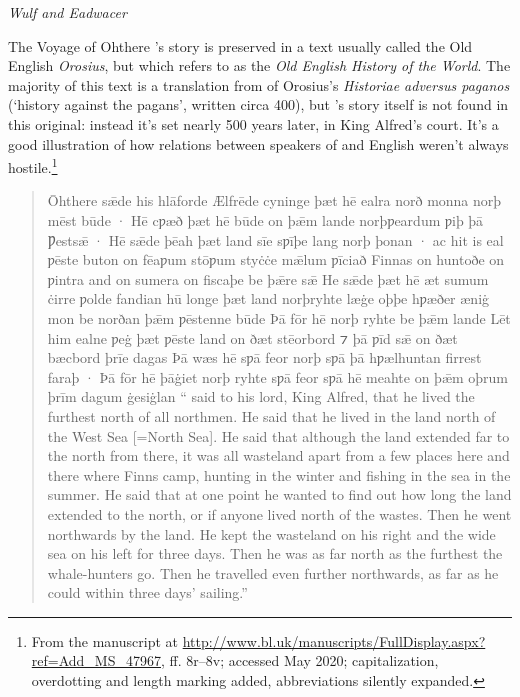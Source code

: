 \begin{texts}{\textit{Wulf and Eadwacer}}
\end{texts}

\begin{texts}{The Voyage of Ohthere}
's story is preserved in a text usually called the Old English \emph{Orosius}, but which \citet{Godden2016} refers to as the \emph{Old English History of the World}. The majority of this text is a translation from  of Orosius's \emph{Historiae adversus paganos} (`history against the pagans', written circa 400), but 's story itself is not found in this  original: instead it's set nearly 500 years later, in King Alfred's court. It's a good illustration of how relations between speakers of  and English weren't always hostile.\footnote{From the manuscript at \url{http://www.bl.uk/manuscripts/FullDisplay.aspx?ref=Add_MS_47967}, ff. 8r--8v; accessed May 2020; capitalization, overdotting and length marking added, abbreviations silently expanded.}

\begin{quote}
    \internallinenumbers*{}
    Ōhthere sǣde his hlāforde Ælfrēde cyninge þæt hē ealra norð monna norþ mēst būde · Hē cƿæð þæt hē būde on þǣm lande norþƿeardum ƿiþ þā Ƿestsǣ · Hē sǣde þēah þæt land sīe sƿīþe lang norþ þonan · ac hit is eal ƿēste buton on fēaƿum stōƿum styċċe mǣlum ƿīciað Finnas on huntoðe on ƿintra and on sumera on fiscaþe be þǣre sǣ He sǣde þæt hē æt sumum ċirre ƿolde fandian hū longe þæt land norþryhte læġe oþþe hƿæðer æniġ mon be norðan þǣm ƿēstenne būde Þā fōr hē norþ ryhte be þǣm lande Lēt him ealne ƿeġ þæt ƿēste land on ðæt stēorbord ⁊ þā ƿīd sǣ on ðæt bæcbord þrīe dagas Þā wæs hē sƿā feor norþ sƿā þā hƿælhuntan firrest faraþ · Þā fōr hē þāġiet norþ ryhte sƿā feor sƿā hē meahte on þǣm oþrum þrīm dagum ġesiġlan
    `` said to his lord, King Alfred, that he lived the furthest north of all northmen. He said that he lived in the land north of the West Sea [=North Sea]. He said that although the land extended far to the north from there, it was all wasteland apart from a few places here and there where Finns camp, hunting in the winter and fishing in the sea in the summer. He said that at one point he wanted to find out how long the land extended to the north, or if anyone lived north of the wastes. Then he went northwards by the land. He kept the wasteland on his right and the wide sea on his left for three days. Then he was as far north as the furthest the whale-hunters go. Then he travelled even further northwards, as far as he could within three days' sailing.''
\end{quote}


\end{texts}

